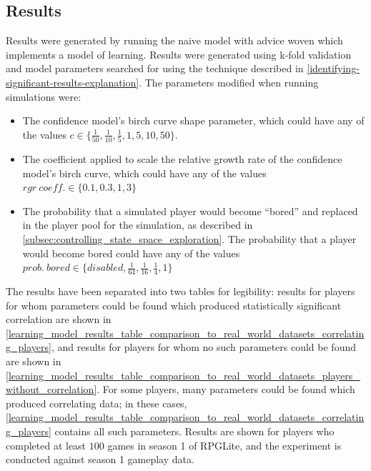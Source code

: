 \subsection{Results}

Results were generated by running the naive model with advice woven which implements a
model of learning. Results were generated using k-fold validation and model
parameters searched for using the technique described in
\cref{identifying-significant-results-explanation}. The parameters modified when
running simulations were:

\begin{itemize}
  \item The confidence model's birch curve shape parameter, which could have any
  of the values $c \in \{\frac{1}{50}, \frac{1}{10},
    \frac{1}{5}, 1, 5, 10, 50\}$.
    \item The coefficient applied to scale the relative growth rate of the
      confidence model's birch curve, which could have any of the values  $rgr
    ~ coeff. \in \{0.1, 0.3, 1, 3\}$
    \item The probability that a simulated player would become ``bored'' and
    replaced in the player pool for the simulation, as described in
    \cref{subsec:controlling_state_space_exploration}. The probability that a
    player would become bored could have any of the values $prob.~bored \in
    \{disabled, \frac{1}{64}, \frac{1}{16}, \frac{1}{4}, 1\}$
\end{itemize}

The results have been separated into two tables for
legibility: results for players for whom parameters could be found which produced statistically
significant correlation are shown in 
\cref{learning_model_results_table_comparison_to_real_world_datasets_correlating_players},
and results for players for whom no such parameters could be found are shown in
\cref{learning_model_results_table_comparison_to_real_world_datasets_players_without_correlation}.
For some players, many parameters could be found which produced correlating
data; in these cases,
\cref{learning_model_results_table_comparison_to_real_world_datasets_correlating_players}
contains all such parameters. Results
are shown for players who completed at least $100$ games in season 1 of RPGLite,
and the experiment is conducted against season 1 gameplay data.


